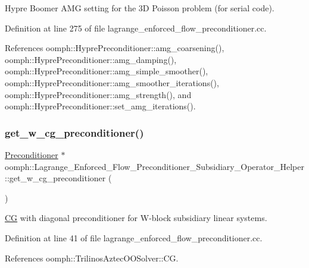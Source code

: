 Hypre Boomer A\+MG setting for the 3D Poisson problem (for serial code). 



Definition at line 275 of file lagrange\+\_\+enforced\+\_\+flow\+\_\+preconditioner.\+cc.



References oomph\+::\+Hypre\+Preconditioner\+::amg\+\_\+coarsening(), oomph\+::\+Hypre\+Preconditioner\+::amg\+\_\+damping(), oomph\+::\+Hypre\+Preconditioner\+::amg\+\_\+simple\+\_\+smoother(), oomph\+::\+Hypre\+Preconditioner\+::amg\+\_\+smoother\+\_\+iterations(), oomph\+::\+Hypre\+Preconditioner\+::amg\+\_\+strength(), and oomph\+::\+Hypre\+Preconditioner\+::set\+\_\+amg\+\_\+iterations().

\mbox{\label{namespaceoomph_1_1Lagrange__Enforced__Flow__Preconditioner__Subsidiary__Operator__Helper_a41dfc7aee7967142be9f4cba3f34a055}} 
\subsubsection{\texorpdfstring{get\+\_\+w\+\_\+cg\+\_\+preconditioner()}{get\_w\_cg\_preconditioner()}}
{\footnotesize\ttfamily \hyperlink{classoomph_1_1Preconditioner}{Preconditioner} $\ast$ oomph\+::\+Lagrange\+\_\+\+Enforced\+\_\+\+Flow\+\_\+\+Preconditioner\+\_\+\+Subsidiary\+\_\+\+Operator\+\_\+\+Helper\+::get\+\_\+w\+\_\+cg\+\_\+preconditioner (\begin{DoxyParamCaption}{ }\end{DoxyParamCaption})}



\hyperlink{classoomph_1_1CG}{CG} with diagonal preconditioner for W-\/block subsidiary linear systems. 



Definition at line 41 of file lagrange\+\_\+enforced\+\_\+flow\+\_\+preconditioner.\+cc.



References oomph\+::\+Trilinos\+Aztec\+O\+O\+Solver\+::\+CG.

